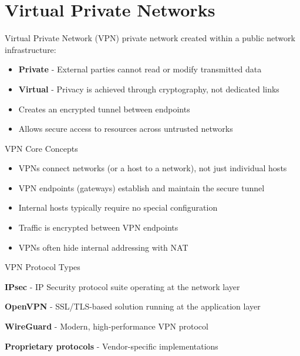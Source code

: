 \section{Virtual Private Networks}


\begin{definition}{Virtual Private Network (VPN)}
 private network created within a public network infrastructure:
\begin{itemize}
    \item \textbf{Private} - External parties cannot read or modify transmitted data
    \item \textbf{Virtual} - Privacy is achieved through cryptography, not dedicated links
    \item Creates an encrypted tunnel between endpoints
    \item Allows secure access to resources across untrusted networks
\end{itemize}
\end{definition}

\begin{theorem}{VPN Core Concepts}
\begin{itemize}
    \item VPNs connect networks (or a host to a network), not just individual hosts
    \item VPN endpoints (gateways) establish and maintain the secure tunnel
    \item Internal hosts typically require no special configuration
    \item Traffic is encrypted between VPN endpoints
    \item VPNs often hide internal addressing with NAT
\end{itemize}
\end{theorem}




\begin{definition}{VPN Protocol Types}

    \textbf{IPsec} - IP Security protocol suite operating at the network layer

    \textbf{OpenVPN} - SSL/TLS-based solution running at the application layer

    \textbf{WireGuard} - Modern, high-performance VPN protocol

    \textbf{Proprietary protocols} - Vendor-specific implementations

\end{definition}

